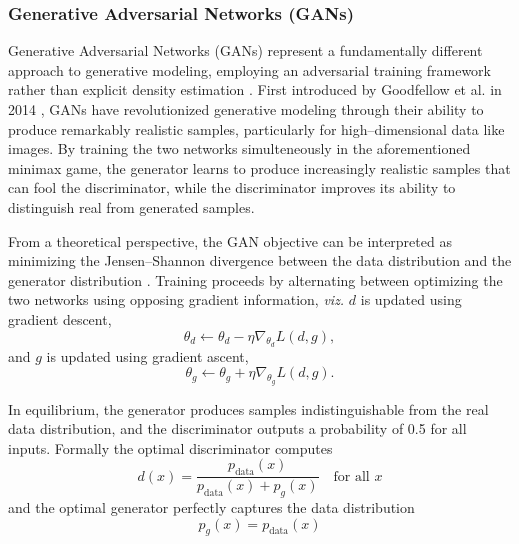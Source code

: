     \subsubsection{Generative Adversarial Networks (GANs)}
        Generative Adversarial Networks (GANs) represent a fundamentally different approach to generative modeling, employing an adversarial training framework rather than explicit density estimation .
        First introduced by Goodfellow et al. in 2014 , GANs have revolutionized generative modeling through their ability to produce remarkably realistic samples, particularly for high--dimensional data like images.
        By training the two networks simulteneously in the aforementioned minimax game, the generator learns to produce increasingly realistic samples that can fool the discriminator, while the discriminator improves its ability to distinguish real from generated samples.
    
        From a theoretical perspective, the GAN objective can be interpreted as minimizing the Jensen--Shannon divergence between the data distribution and the generator distribution .
        Training proceeds by alternating between optimizing the two networks using opposing gradient information, \textit{viz.} \(d\) is updated using gradient descent,
        \begin{equation}
            \theta_d \leftarrow \theta_d - \eta \nabla_{\theta_d} L(d, g),
        \end{equation}
        and \(g\) is updated using gradient ascent,
        \begin{equation}
            \theta_g \leftarrow \theta_g + \eta \nabla_{\theta_g} L(d, g).
        \end{equation}
        
        In equilibrium, the generator produces samples indistinguishable from the real data distribution, and the discriminator outputs a probability of 0.5 for all inputs.
        Formally the optimal discriminator computes
        \begin{equation}
            d(x) = \frac{p_{\text{data}}(x)}{p_{\text{data}}(x) + p_g(x)}\quad\text{for all } x
        \end{equation}
        and the optimal generator perfectly captures the data distribution
        \begin{equation}
            p_g(x) = p_{\text{data}}(x)
        \end{equation}
        
